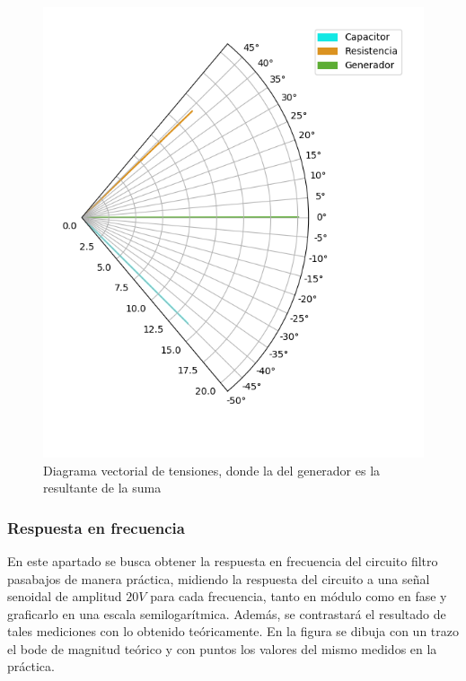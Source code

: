 \begin{figure}[H]
	\begin{center}
		\includegraphics[scale=0.55]{../Desarrollo/diagrama_vectorial.png}
	\end{center}
	\caption{Diagrama vectorial de tensiones, donde la del generador es la resultante de la suma}
\end{figure}

\subsubsection*{Respuesta en frecuencia}

En este apartado se busca obtener la respuesta en frecuencia del circuito filtro pasabajos de manera pr\'actica, midiendo la respuesta del circuito a una se\~nal senoidal de amplitud $20V$ para cada frecuencia, tanto en m\'odulo como en fase y graficarlo en una escala semilogar\'itmica. Adem\'as, se contrastar\'a el resultado de tales mediciones con lo obtenido te\'oricamente. En la figura  se dibuja con un trazo el bode de magnitud te\'orico y con puntos los valores del mismo medidos en la pr\'actica.

